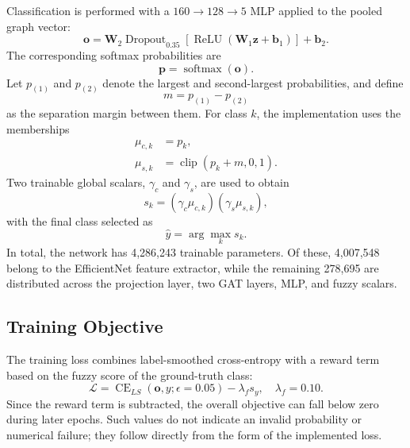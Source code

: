 \documentclass[10pt,conference]{IEEEtran}
\begin{document}
Classification is performed with a $160\rightarrow128\rightarrow5$ MLP applied to the pooled graph vector:
\begin{equation}
\mathbf{o}=\mathbf{W}_{2}\operatorname{Dropout}_{0.35}
\left[\operatorname{ReLU}(\mathbf{W}_{1}\mathbf{z}+\mathbf{b}_{1})\right]
+\mathbf{b}_{2}.
\end{equation}
The corresponding softmax probabilities are
\begin{equation}
\mathbf{p}=\operatorname{softmax}(\mathbf{o}).
\end{equation}
Let $p_{(1)}$ and $p_{(2)}$ denote the largest and second-largest probabilities, and define
\begin{equation}
m=p_{(1)}-p_{(2)}
\end{equation}
as the separation margin between them. For class $k$, the implementation uses the memberships
\begin{align}
\mu_{c,k}&=p_k,\\
\mu_{s,k}&=\operatorname{clip}(p_k+m,0,1).
\end{align}
Two trainable global scalars, $\gamma_c$ and $\gamma_s$, are used to obtain
\begin{equation}
s_k=(\gamma_c\mu_{c,k})(\gamma_s\mu_{s,k}),
\end{equation}
with the final class selected as
\begin{equation}
\hat{y}=\arg\max_k s_k.
\end{equation}
In total, the network has 4,286,243 trainable parameters. Of these, 4,007,548 belong to the EfficientNet feature extractor, while the remaining 278,695 are distributed across the projection layer, two GAT layers, MLP, and fuzzy scalars.

\subsection{Training Objective}

The training loss combines label-smoothed cross-entropy with a reward term based on the fuzzy score of the ground-truth class:
\begin{equation}
\mathcal{L}=\operatorname{CE}_{LS}(\mathbf{o},y;\epsilon=0.05)-\lambda_f s_y,
\quad \lambda_f=0.10.
\label{eq:loss}
\end{equation}
Since the reward term is subtracted, the overall objective can fall below zero during later epochs. Such values do not indicate an invalid probability or numerical failure; they follow directly from the form of the implemented loss.
\end{document}
